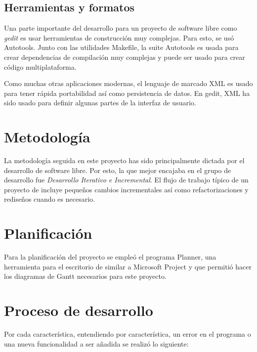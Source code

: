 \subsection{Herramientas y formatos}

Una parte importante del desarrollo para un proyecto de software libre como
\emph{gedit} es usar herramientas de construcción muy complejas. Para esto,
se usó Autotools. Junto con las utilidades Makefile, la suite Autotools
es usada para crear dependencias de compilación muy complejas y puede ser
usado para crear código multiplataforma.

Como muchas otras aplicaciones modernas, el lenguaje de marcado XML es usado
para tener rápida portabilidad así como persistencia de datos. En gedit, XML
ha sido usado para definir algunas partes de la interfaz de usuario.

\newpage
\section{Metodología}

La metodología seguida en este proyecto has sido principalmente dictada 
por el desarrollo de software libre. Por esto, la que mejor encajaba en el
grupo de desarrollo fue \emph{Desarrollo Iterativo e Incremental}.
El flujo de trabajo típico de un proyecto de \GNOME incluye pequeños cambios
incrementales así como refactorizaciones y rediseños cuando es necesario.

\section{Planificación}

Para la planificación del proyecto se empleó el programa Planner, una
herramienta para el escritorio de \GNOME similar a Microsoft Project y
que permitió hacer los diagramas de Gantt necesarios para este proyecto.

\section{Proceso de desarrollo}

Por cada característica, entendiendo por característica, un error en el
programa o una nueva funcionalidad a ser añadida se realizó lo siguiente:

